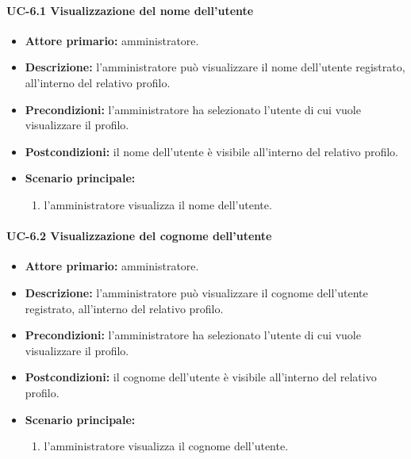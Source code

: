     \paragraph{UC-6.1 Visualizzazione del nome dell'utente}
    \begin{itemize}
        \item \textbf{Attore primario:} amministratore.
        
        \item \textbf{Descrizione:} l'amministratore può visualizzare il nome dell'utente registrato, all'interno del relativo profilo.
        
        \item \textbf{Precondizioni:} l'amministratore ha selezionato l'utente di cui vuole visualizzare il profilo.
    
        \item \textbf{Postcondizioni:} il nome dell'utente è visibile all'interno del relativo profilo.
    
        \item \textbf{Scenario principale:}
        \begin{enumerate}
            \item  l'amministratore visualizza il nome dell'utente.
        \end{enumerate}
    \end{itemize}

    \paragraph{UC-6.2 Visualizzazione del cognome dell'utente}
    \begin{itemize}
        \item \textbf{Attore primario:} amministratore.
        
        \item \textbf{Descrizione:} l'amministratore può visualizzare il cognome dell'utente registrato, all'interno del relativo profilo.
        
        \item \textbf{Precondizioni:} l'amministratore ha selezionato l'utente di cui vuole visualizzare il profilo.
    
        \item \textbf{Postcondizioni:} il cognome dell'utente è visibile all'interno del relativo profilo.
    
        \item \textbf{Scenario principale:}
        \begin{enumerate}
            \item  l'amministratore visualizza il cognome dell'utente.
        \end{enumerate}
    \end{itemize}

